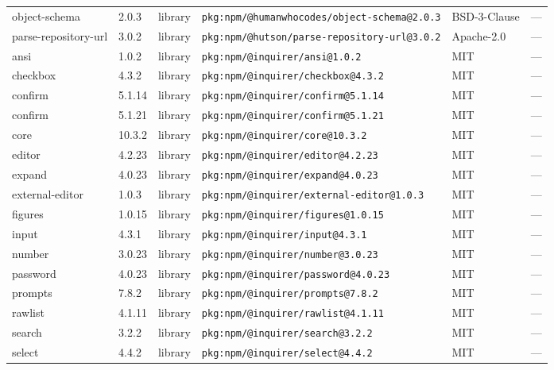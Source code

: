 \documentclass[11pt,a4paper]{article}
\begin{document}
\begin{longtable}{|p{4cm}|p{2cm}|p{1.6cm}|p{5cm}|p{1.5cm}|p{3.5cm}|}
\raggedright object-schema & 2.0.3 & library & \small\texttt{pkg:npm/@humanwhocodes/object-schema@2.0.3} & BSD-3-Clause & \small — \\
\raggedright parse-repository-url & 3.0.2 & library & \small\texttt{pkg:npm/@hutson/parse-repository-url@3.0.2} & Apache-2.0 & \small — \\
\raggedright ansi & 1.0.2 & library & \small\texttt{pkg:npm/@inquirer/ansi@1.0.2} & MIT & \small — \\
\raggedright checkbox & 4.3.2 & library & \small\texttt{pkg:npm/@inquirer/checkbox@4.3.2} & MIT & \small — \\
\raggedright confirm & 5.1.14 & library & \small\texttt{pkg:npm/@inquirer/confirm@5.1.14} & MIT & \small — \\
\raggedright confirm & 5.1.21 & library & \small\texttt{pkg:npm/@inquirer/confirm@5.1.21} & MIT & \small — \\
\raggedright core & 10.3.2 & library & \small\texttt{pkg:npm/@inquirer/core@10.3.2} & MIT & \small — \\
\raggedright editor & 4.2.23 & library & \small\texttt{pkg:npm/@inquirer/editor@4.2.23} & MIT & \small — \\
\raggedright expand & 4.0.23 & library & \small\texttt{pkg:npm/@inquirer/expand@4.0.23} & MIT & \small — \\
\raggedright external-editor & 1.0.3 & library & \small\texttt{pkg:npm/@inquirer/external-editor@1.0.3} & MIT & \small — \\
\raggedright figures & 1.0.15 & library & \small\texttt{pkg:npm/@inquirer/figures@1.0.15} & MIT & \small — \\
\raggedright input & 4.3.1 & library & \small\texttt{pkg:npm/@inquirer/input@4.3.1} & MIT & \small — \\
\raggedright number & 3.0.23 & library & \small\texttt{pkg:npm/@inquirer/number@3.0.23} & MIT & \small — \\
\raggedright password & 4.0.23 & library & \small\texttt{pkg:npm/@inquirer/password@4.0.23} & MIT & \small — \\
\raggedright prompts & 7.8.2 & library & \small\texttt{pkg:npm/@inquirer/prompts@7.8.2} & MIT & \small — \\
\raggedright rawlist & 4.1.11 & library & \small\texttt{pkg:npm/@inquirer/rawlist@4.1.11} & MIT & \small — \\
\raggedright search & 3.2.2 & library & \small\texttt{pkg:npm/@inquirer/search@3.2.2} & MIT & \small — \\
\raggedright select & 4.4.2 & library & \small\texttt{pkg:npm/@inquirer/select@4.4.2} & MIT & \small — \\

\end{longtable}
\end{document}
